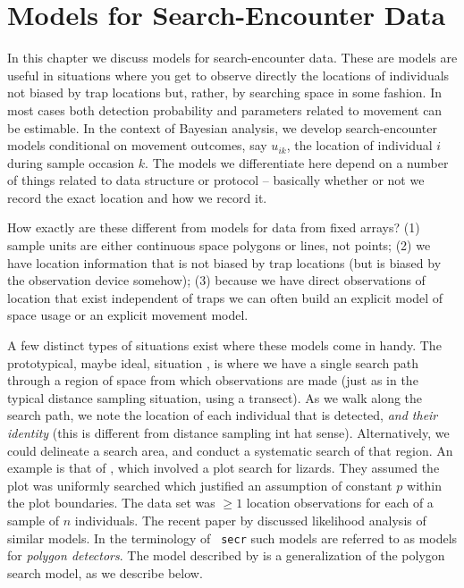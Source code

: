 \chapter{Models for  Search-Encounter Data}
\label{chapt.search-encounter}

\vspace{0.3cm}


In this chapter we discuss models for search-encounter data. These are
models are useful in situations where you get to observe directly the
locations of individuals not biased by trap locations but, rather, by
searching space in some fashion. In most cases both detection
probability and parameters related to movement can be estimable. In
the context of Bayesian analysis, we develop search-encounter models
conditional on movement outcomes, say $u_{ik}$, the location of
individual $i$ during sample occasion $k$.  The models we
differentiate here depend on a number of things related to data
structure or protocol -- basically whether or not we record the exact
location and how we record it.

How exactly are these different from models for data from fixed
arrays?  (1) sample units are either continuous space polygons or
lines, not points; (2) we have location information that is not biased
by trap locations (but is biased by the observation device somehow);
(3) because we have direct observations of location that exist
independent of traps we can often build an explicit model of space
usage or an explicit movement model.

A few distinct types of situations exist where these models come in
handy. The prototypical, maybe ideal, situation
\citet{royle_etal:2011mee}, is where we have a single search path
through a region of space from which observations are made (just as in
the typical distance sampling situation, using a transect). As we walk
along the search path, we note the location of each individual that is
detected, {\it and their identity} (this is different from distance
sampling int hat sense). Alternatively, we could delineate a search
area, and conduct a systematic search of that region.  An example is
that of \citet{royle_young:2008}, which involved a plot search for
lizards. They assumed the plot was uniformly searched which justified
an assumption of constant $p$ within the plot boundaries. The data set
was $\ge 1$ location observations for each of a sample of $n$
individuals.  The recent paper by \citet{efford:2011} discussed
likelihood analysis of similar models. In the terminology of \mbox{\tt
  secr} such models are referred to as models for {\it polygon
  detectors}.  The model described by \citep{royle_etal:2011mee} is a
generalization of the polygon search model, as we describe below.

